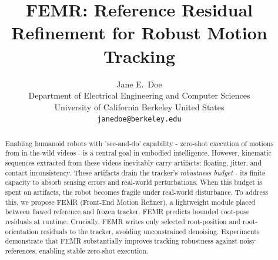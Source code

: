 \documentclass{article}
\title{FEMR: Reference Residual Refinement for Robust Motion Tracking}
\author{
  Jane E.~Doe\\
  Department of Electrical Engineering and Computer Sciences\\
  University of California Berkeley 
  United States\\
  \texttt{janedoe@berkeley.edu} \\
}
\begin{document}
\maketitle


\begin{abstract}






	Enabling humanoid robots with 'see-and-do' capability - zero-shot execution of motions from in-the-wild videos - is a central goal in embodied intelligence. However, kinematic sequences extracted from these videos inevitably carry artifacts: floating, jitter, and contact inconsistency. These artifacts drain the tracker's \textit{robustness budget} - its finite capacity to absorb sensing errors and real-world perturbations. When this budget is spent on artifacts, the robot becomes fragile under real-world disturbance. To address this, we propose FEMR (Front-End Motion Refiner), a lightweight module placed between flawed reference and frozen tracker. FEMR predicts bounded root-pose residuals at runtime. Crucially, FEMR writes only selected root-position and root-orientation residuals to the tracker, avoiding unconstrained denoising. Experiments demonstrate that FEMR substantially improves tracking robustness against noisy references, enabling stable zero-shot execution.
\end{abstract}

\end{document}
